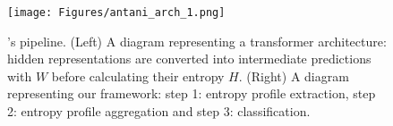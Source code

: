 \begin{figure}[ht]
    \centering
    \texttt{[image: Figures/antani\_arch\_1.png]}
    \caption{\entropylens's pipeline. (Left) A diagram representing a transformer architecture: hidden representations are converted into intermediate predictions with $W$ before calculating their entropy $H$. (Right) A diagram representing our framework: step 1: entropy profile extraction, step 2: entropy profile aggregation and step 3: classification.}
    \label{fig:architecture}
\end{figure}


